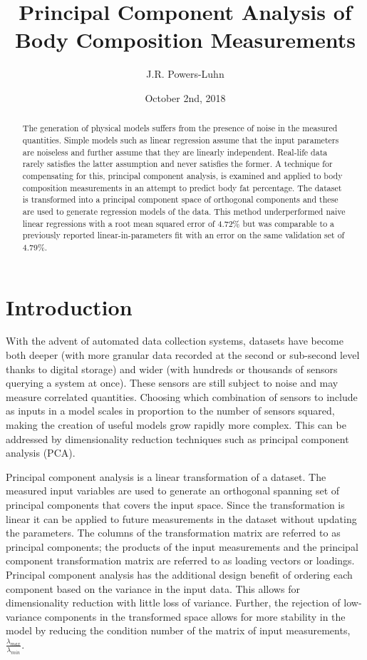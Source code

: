 \documentclass{IEEEtran}
\author{J.R. Powers-Luhn}
\title{Principal Component Analysis of Body Composition Measurements}
\date{October 2nd, 2018}
\begin{document}
\maketitle

\begin{abstract}

The generation of physical models suffers from the presence of noise in the measured quantities. Simple models such as linear regression assume that the input parameters are noiseless and further assume that they are linearly independent. Real-life data rarely satisfies the latter assumption and never satisfies the former. A technique for compensating for this, principal component analysis, is examined and applied to body composition measurements in an attempt to predict body fat percentage. The dataset is transformed into a principal component space of orthogonal components and these are used to generate regression models of the data. This method underperformed naive linear regressions with a root mean squared error of \num{4.72}\% but was comparable to a previously reported linear-in-parameters fit with an error on the same validation set of \num{4.79}\%.

\end{abstract}

\section{Introduction}

With the advent of automated data collection systems, datasets have become both deeper (with more granular data recorded at the second or sub-second level thanks to digital storage) and wider (with hundreds or thousands of sensors querying a system at once). These sensors are still subject to noise and may measure correlated quantities. Choosing which combination of sensors to include as inputs in a model scales in proportion to the number of sensors squared, making the creation of useful models grow rapidly more complex. This can be addressed by dimensionality reduction techniques such as principal component analysis (PCA). 

Principal component analysis is a linear transformation of a dataset. The measured input variables are used to generate an orthogonal spanning set of principal components that covers the input space. Since the transformation is linear it can be applied to future measurements in the dataset without updating the parameters. The columns of the transformation matrix are referred to as principal components; the products of the input measurements and the principal component transformation matrix are referred to as loading vectors or loadings. Principal component analysis has the additional design benefit of ordering each component based on the variance in the input data. This allows for dimensionality reduction with little loss of variance. Further, the rejection of low-variance components in the transformed space allows for more stability in the model by reducing the condition number of the matrix of input measurements, $\frac{\lambda_{max}}{\lambda_{min}}$.
\end{document}
